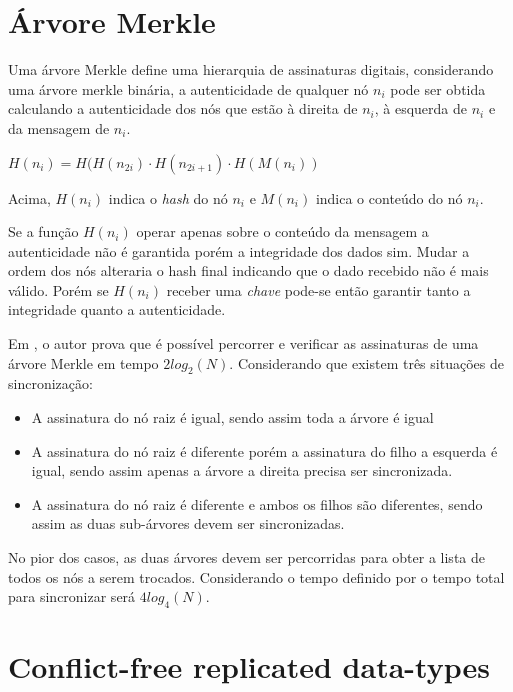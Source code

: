 \documentclass[12pt]{article}
\begin{document}
\section{Árvore Merkle}

Uma árvore Merkle\cite{merkle:88} define uma hierarquia de assinaturas digitais, considerando uma árvore merkle binária, a autenticidade de qualquer nó \ensuremath{n_i} pode ser obtida calculando a autenticidade dos nós que estão à direita de \ensuremath{n_i}, à esquerda de \ensuremath{n_i} e da mensagem de \ensuremath{n_i}.

\ensuremath{H(n_i) = H(H(n_{2i}) \cdot H(n_{2i+1}) \cdot H(M(n_i))}

Acima, \ensuremath{H(n_i)} indica o {\it hash} do nó \ensuremath{n_i} e \ensuremath{M(n_i)} indica o conteúdo do nó \ensuremath{n_i}.

Se a função \ensuremath{H(n_i)} operar apenas sobre o conteúdo da mensagem a autenticidade não é garantida porém a integridade dos dados sim. Mudar a ordem dos nós alteraria o hash final indicando que o dado recebido não é mais válido. Porém se \ensuremath{H(n_i)} receber uma {\it chave} pode-se então garantir tanto a integridade quanto a autenticidade.

Em \cite{merkletree_traversal}, o autor prova que é possível percorrer e verificar as assinaturas de uma árvore Merkle em tempo \ensuremath{2log_2(N)}. Considerando que existem três situações de sincronização:

\begin{itemize}
    \item A assinatura do nó raiz é igual, sendo assim toda a árvore é igual
    \item A assinatura do nó raiz é diferente porém a assinatura do filho a esquerda é igual, sendo assim apenas a árvore a direita precisa ser sincronizada.
    \item A assinatura do nó raiz é diferente e ambos os filhos são diferentes, sendo assim as duas sub-árvores devem ser sincronizadas.
\end{itemize}

No pior dos casos, as duas árvores devem ser percorridas para obter a lista de todos os nós a serem trocados. Considerando o tempo definido por \cite{merkletree_traversal} o tempo total para sincronizar será \ensuremath{4log_4(N)}.

\section{Conflict-free replicated data-types}
\end{document}
